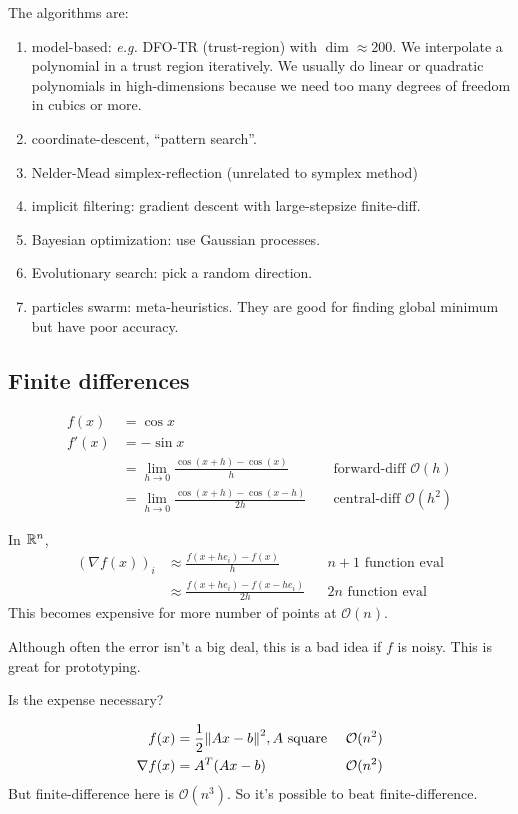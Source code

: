 \documentclass[class=article,crop=false]{standalone}
\begin{document}
The algorithms are:
 \begin{enumerate}[label=(\arabic*)]
	 \item model-based: \emph{e.g.} DFO-TR (trust-region) with $ \dim \approx 200$. We interpolate a polynomial in a trust region iteratively. We usually do linear or quadratic polynomials in high-dimensions because we need too many degrees of freedom in cubics or more.
	 \item coordinate-descent, ``pattern search''.
	 \item Nelder-Mead simplex-reflection (unrelated to symplex method)
	 \item implicit filtering: gradient descent with large-stepsize finite-diff.
	 \item Bayesian optimization: use Gaussian processes. 
	 \item Evolutionary search: pick a random direction.
	 \item particles swarm: meta-heuristics. They are good for finding global minimum but have poor accuracy.
\end{enumerate}

\subsection{Finite differences}
\begin{eg}

\begin{align*}
	f(x) &= \cos x\\
	f'(x) &= -\sin x\\
	      &= \lim_{ h \to 0} \frac{\cos(x+h)- \cos(x)}{ h}&& \text{ forward-diff } \mathcal{ O}(h)\\
	      &= \lim_{ h \to 0} \frac{\cos(x+h)-\cos(x-h)}{2h } &&\text{ central-diff } \mathcal{ O}(h^2)
\end{align*}

\end{eg}
In $ \mathbb{R}^{n}$,
\begin{align*}
	(\nabla f(x))_i &\approx \frac{f(x+he_i)-f(x)}{ h} && n+1 \text{ function eval} \\
			&\approx \frac{f(x+he_i)-f(x-he_i)}{ 2h} && 2n \text{ function eval}
\end{align*}
This becomes expensive for more number of points at $ \mathcal{ O}(n)$.

Although often the error isn't a big deal, this is a bad idea if $ f$ is noisy. This is great for prototyping. 

Is the expense necessary?
\begin{eg}
\begin{align*}
	f(x) &= \frac{1}{2} {\left\lVert{ Ax-b}\right\rVert}^2, A \text{ square } && \mathcal{ O}(n^2)\\  
	\nabla f(x) &= A^{T}(Ax-b) && \mathcal{ O}(n^2)
\end{align*}
But finite-difference here is $ \mathcal{ O}(n^3)$. So it's possible to beat finite-difference.
\end{eg}
\end{document}
